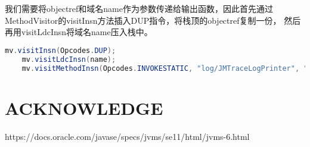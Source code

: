 \documentclass[UTF8]{article}
\begin{document}
我们需要将objectref和域名name作为参数传递给输出函数，因此首先通过MethodVisitor的visitInsn方法插入DUP指令，将栈顶的objectref复制一份，
然后再用visitLdcInsn将域名name压入栈中。
\begin{lstlisting}[language=Java]
    mv.visitInsn(Opcodes.DUP);
    mv.visitLdcInsn(name);
    mv.visitMethodInsn(Opcodes.INVOKESTATIC, "log/JMTraceLogPrinter", "getLogPrint", "(Ljava/lang/Object;Ljava/lang/String;)V", false);
\end{lstlisting}



\section{ACKNOWLEDGE}
https://docs.oracle.com/javase/specs/jvms/se11/html/jvms-6.html
\end{document}
